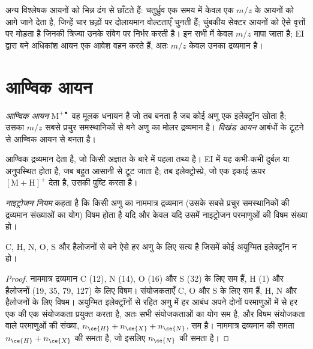 अन्य विश्लेषक आयनों को भिन्न ढंग से छाँटते हैं: चतुर्ध्रुव एक समय में केवल एक $m/z$ के आयनों को आगे जाने देता है,
जिन्हें चार छड़ों पर दोलायमान वोल्टताएँ चुनती हैं; चुंबकीय सेक्टर आयनों को ऐसे वृत्तों पर मोड़ता है जिनकी त्रिज्या
उनके संवेग पर निर्भर करती है। इन सभी में केवल $m/z$ मापा जाता है; EI द्वारा बने अधिकांश आयन एक
आवेश वहन करते हैं, अतः $m/z$ केवल उनका द्रव्यमान है।

\section{आण्विक आयन}

\begin{definition}[आण्विक और विखंड आयन]\label{def:b2:mass-spec-atomic:molecular-ion}
\emph{आण्विक आयन} $\mathrm M^{+\bullet}$ वह मूलक धनायन है जो तब बनता है जब कोई
अणु एक इलेक्ट्रॉन खोता है; उसका $m/z$ सबसे प्रचुर समस्थानिकों से बने अणु का
मोलर द्रव्यमान है। \emph{विखंड आयन} आबंधों के टूटने से आण्विक आयन से
बनता है।
\end{definition}

 आण्विक द्रव्यमान देता है, जो किसी अज्ञात के बारे में पहला तथ्य है। EI में यह कभी-कभी दुर्बल या
अनुपस्थित होता है, जब  बहुत आसानी से टूट जाता है; तब इलेक्ट्रोस्प्रे, जो एक इकाई ऊपर $[\mathrm M +
\mathrm H]^+$ देता है, उसकी पुष्टि करता है।

\begin{definition}[नाइट्रोजन नियम]\label{def:b2:mass-spec-atomic:nitrogen-rule}
\emph{नाइट्रोजन नियम} कहता है कि किसी अणु का नाममात्र द्रव्यमान (उसके सबसे प्रचुर
समस्थानिकों की द्रव्यमान संख्याओं का योग) विषम होता है यदि और केवल यदि उसमें नाइट्रोजन परमाणुओं की
विषम संख्या हो।
\end{definition}

\begin{proposition}[नाइट्रोजन नियम की वैधता]\label{prop:b2:mass-spec-atomic:nitrogen-rule}
 C, H, N, O, S और हैलोजनों से बने ऐसे हर अणु के लिए सत्य है जिसमें कोई
अयुग्मित इलेक्ट्रॉन न हो।
\end{proposition}

\begin{proof}
नाममात्र द्रव्यमान C (12), N (14), O (16) और S (32) के लिए सम हैं, H (1) और हैलोजनों (19,
35, 79, 127) के लिए विषम। संयोजकताएँ C, O और S के लिए सम हैं, H, N और हैलोजनों के लिए विषम। अयुग्मित
इलेक्ट्रॉनों से रहित अणु में हर आबंध अपने दोनों परमाणुओं में से हर एक की एक संयोजकता प्रयुक्त करता है, अतः सभी
संयोजकताओं का योग सम है, और विषम संयोजकता वाले परमाणुओं की संख्या, $n_{\ce{H}} + n_{\ce{X}} + n_{\ce{N}}$,
सम है। नाममात्र द्रव्यमान की समता $n_{\ce{H}} + n_{\ce{X}}$ की समता है, जो इसलिए
$n_{\ce{N}}$ की समता है।
\end{proof}

